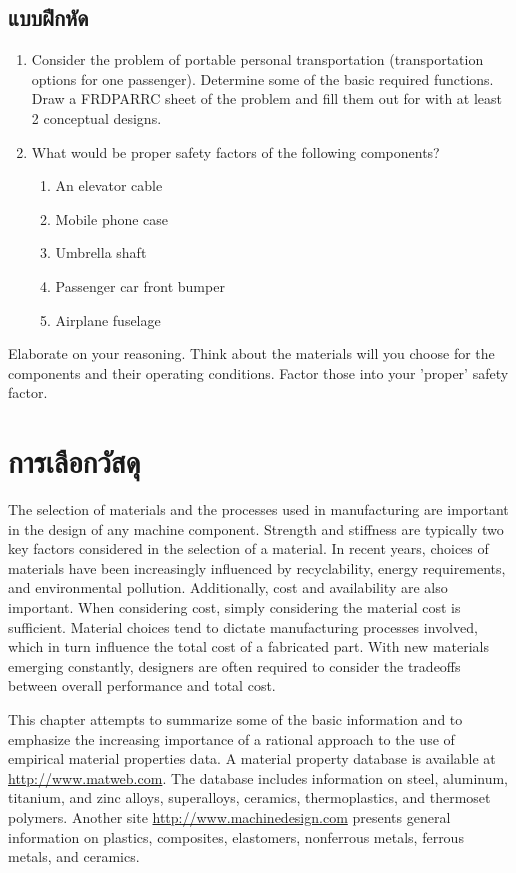 \documentclass[a4paper,openany,12pt]{book}
\begin{document}
\section{แบบฝึกหัด}
\label{exercises}
\begin{enumerate}
\item Consider the problem of portable personal transportation (transportation options for one passenger). Determine some of the basic required functions. Draw a FRDPARRC sheet of the problem and fill them out for with at least 2 conceptual designs.
\item What would be proper safety factors of the following components?
\begin{enumerate}
\item An elevator cable
\item Mobile phone case
\item Umbrella shaft
\item Passenger car front bumper
\item Airplane fuselage
\end{enumerate}
\end{enumerate}

Elaborate on your reasoning. Think about the materials will you choose for the components and their operating conditions. Factor those into your 'proper' safety factor.

\chapter{การเลือกวัสดุ}
\label{material-selection}
The selection of materials and the processes used in manufacturing are
important in the design of any machine component. Strength and stiffness
are typically two key factors considered in the selection of a material.
In recent years, choices of materials have been increasingly influenced
by recyclability, energy requirements, and environmental pollution.
Additionally, cost and availability are also important. When considering
cost, simply considering the material cost is sufficient. Material
choices tend to dictate manufacturing processes involved, which in turn
influence the total cost of a fabricated part. With new materials
emerging constantly, designers are often required to consider the
tradeoffs between overall performance and total cost.

This chapter attempts to summarize some of the basic information and to
emphasize the increasing importance of a rational approach to the use of
empirical material properties data. A material property database is
available at \url{http://www.matweb.com}. The database includes
information on steel, aluminum, titanium, and zinc alloys, superalloys,
ceramics, thermoplastics, and thermoset polymers. Another site
\url{http://www.machinedesign.com} presents general information on
plastics, composites, elastomers, nonferrous metals, ferrous metals, and
ceramics.
\end{document}
